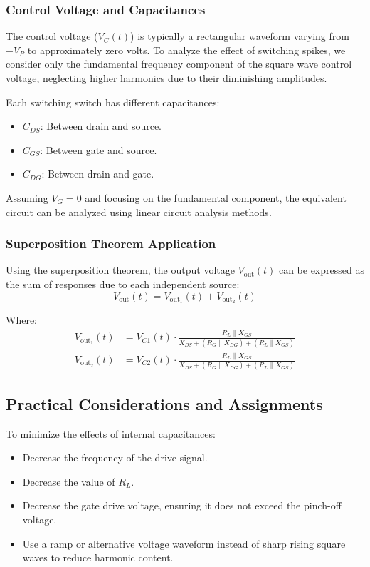 \subsubsection{Control Voltage and Capacitances}
The control voltage (\( V_C(t) \)) is typically a rectangular waveform varying from \(-V_P\) to approximately zero volts. To analyze the effect of switching spikes, we consider only the fundamental frequency component of the square wave control voltage, neglecting higher harmonics due to their diminishing amplitudes.

Each switching switch has different capacitances:
\begin{itemize}
    \item \( C_{DS} \): Between drain and source.
    \item \( C_{GS} \): Between gate and source.
    \item \( C_{DG} \): Between drain and gate.
\end{itemize}

Assuming \( V_G = 0 \) and focusing on the fundamental component, the equivalent circuit can be analyzed using linear circuit analysis methods.

\subsubsection{Superposition Theorem Application}
Using the superposition theorem, the output voltage \( V_{\text{out}}(t) \) can be expressed as the sum of responses due to each independent source:
\begin{equation}
V_{\text{out}}(t) = V_{\text{out}_1}(t) + V_{\text{out}_2}(t)
\end{equation}

Where:
\begin{align}
V_{\text{out}_1}(t) &= V_{C1}(t) \cdot \frac{R_L \parallel X_{GS}}{X_{DS} + (R_G \parallel X_{DG}) + (R_L \parallel X_{GS})} \\
V_{\text{out}_2}(t) &= V_{C2}(t) \cdot \frac{R_L \parallel X_{GS}}{X_{DS} + (R_G \parallel X_{DG}) + (R_L \parallel X_{GS})}
\end{align}


\subsection{Practical Considerations and Assignments}
To minimize the effects of internal capacitances:
\begin{itemize}
    \item Decrease the frequency of the drive signal.
    \item Decrease the value of \( R_L \).
    \item Decrease the gate drive voltage, ensuring it does not exceed the pinch-off voltage.
    \item Use a ramp or alternative voltage waveform instead of sharp rising square waves to reduce harmonic content.
\end{itemize}

